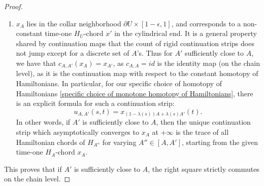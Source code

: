 \documentclass{amsart}
\numberwithin{equation}{section}
\numberwithin{figure}{section}
\begin{document}
\begin{proof}
\begin{enumerate}[label=(\roman*)]
\item $x_{A}$ lies in the collar neighborhood $\partial U \times [1-\epsilon, 1]$, and corresponds to a non-constant time-one $H_{U}$-chord $x'$ in the cylindrical end. It is a general property shared by continuation maps that the count of rigid continuation strips does not jump except for a discrete set of $A$'s. Thus for $A'$ sufficiently close to $A$, we have that $c_{A, A'}(x_{A}) = x_{A'}$, as $c_{A, A} = id$ is the identity map (on the chain level), as it is the continuation map with respect to the constant homotopy of Hamiltonians.
In particular, for our specific choice of homotopy of Hamiltonians \eqref{specific choice of monotone homotopy of Hamiltonians}, there is an explicit formula for such a continuation strip:
\begin{equation}\label{unique continuation strip}
u_{A, A'}(s, t) = x_{(1-\lambda(s))A + \lambda(s)A'}(t).
\end{equation}
In other words, if $A'$ is sufficiently close to $A$, then the unique continuation strip which asymptotically converges to $x_{A}$ at $+\infty$ is the trace of all Hamiltonian chords of $H_{A''}$ for varying $A'' \in [A, A']$, starting from the given time-one $H_{A}$-chord $x_{A}$.

\end{enumerate}
This proves that if $A'$ is sufficiently close to $A$, the right square strictly commutes on the chain level. \par


\end{proof}
\end{document}
